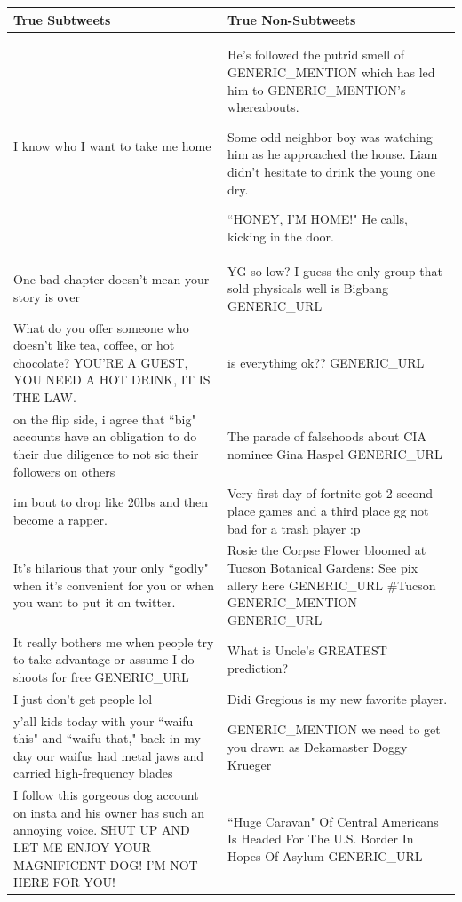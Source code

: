 \documentclass[11pt, twoside, reqno]{book}
\begin{document}
\begin{center}
	\begin{tabular}{ | p{20em} | p{20em} | }
		\hline
		True Subtweets&True Non-Subtweets
		\\
		\hline
		I know who I want to take me home
		&
		He's followed the putrid smell of GENERIC\_MENTION which has led him to GENERIC\_MENTION's whereabouts.

		Some odd neighbor boy was watching him as he approached the house.
		Liam didn't hesitate to drink the young one dry.

		``HONEY, I'M HOME!"
		He calls, kicking in the door.
		\\
		\hline
		One bad chapter doesn't mean your story is over
		&
		YG so low? I guess the only group that sold physicals well is Bigbang GENERIC\_URL
		\\
		\hline
		What do you offer someone who doesn't like tea, coffee, or hot chocolate? YOU'RE A GUEST, YOU NEED A HOT DRINK, IT IS THE LAW.
		&
		is everything ok?? GENERIC\_URL
		\\
		\hline
		on the flip side, i agree that ``big" accounts have an obligation to do their due diligence to not sic their followers on others
		&
		The parade of falsehoods about CIA nominee Gina Haspel GENERIC\_URL
		\\
		\hline
		im bout to drop like 20lbs and then become a rapper.
		&
		Very first day of fortnite got 2 second place games and a third place gg not bad for a trash player :p
		\\
		\hline
		It's hilarious that your only ``godly" when it's convenient for you or when you want to put it on twitter.
		&
		Rosie the Corpse Flower bloomed at Tucson Botanical Gardens: See pix allery here GENERIC\_URL \#Tucson GENERIC\_MENTION GENERIC\_URL
		\\
		\hline
		It really bothers me when people try to take advantage or assume I do shoots for free GENERIC\_URL
		&
		What is Uncle's GREATEST prediction?
		\\
		\hline
		I just don't get people lol
		&
		Didi Gregious is my new favorite player.
		\\
		\hline
		y'all kids today with your ``waifu this" and ``waifu that," back in my day our waifus had metal jaws and carried high-frequency blades
		&
		GENERIC\_MENTION we need to get you drawn as Dekamaster Doggy Krueger
		\\
		\hline
		I follow this gorgeous dog account on insta and his owner has such an annoying voice. SHUT UP AND LET ME ENJOY YOUR MAGNIFICENT DOG! I'M NOT HERE FOR YOU!
		&
		``Huge Caravan" Of Central Americans Is Headed For The U.S. Border In Hopes Of Asylum GENERIC\_URL
		\\
		\hline
	\end{tabular}
\end{center}
\end{document}
